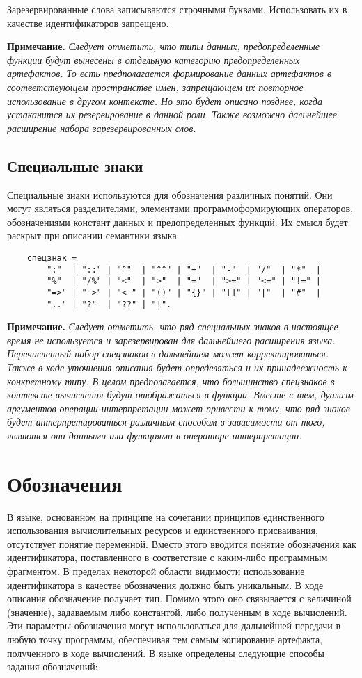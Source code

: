 {Зарезервированные слова записываются строчными буквами. Использовать их в качестве идентификаторов запрещено.

\textbf{Примечание.}
\textit{Следует отметить, что типы данных, предопределенные функции будут вынесены в отдельную категорию предопределенных артефактов. То есть предполагается формирование данных артефактов в соответствующем пространстве имен, запрещающем их повторное использование в другом контексте. Но это будет описано позднее, когда устаканится их резервирование в данной роли. Также возможно дальнейшее расширение набора зарезервированных слов.}

\subsection{Специальные знаки}

Специальные знаки используются для обозначения различных понятий. Они могут являться разделителями, элементами программоформирующих операторов, обозначениями констант данных и предопределенных функций. Их смысл будет раскрыт при описании семантики языка.

\begin{verbatim}
    спецзнак =
        ":"  | "::" | "^"  | "^^" | "+"  | "-"  | "/"  | "*"  |
        "%"  | "/%" | "<"  | ">"  | "="  | ">=" | "<=" | "!=" |
        "=>" | "->" | "<-" | "()" | "{}" | "[]" | "|"  | "#"  |
        ".." | "?"  | "??" | "!".
\end{verbatim}

\textbf{Примечание.}
\textit{Следует отметить, что ряд специальных знаков в настоящее время не используется и зарезервирован для дальнейшего расширения языка. Перечисленный набор спецзнаков в дальнейшем может корректироваться. Также в ходе уточнения описания будет определяться и их принадлежность к конкретному типу. В целом предполагается, что большинство спецзнаков в контексте вычисления будут отображаться в функции. Вместе с тем, дуализм аргументов операции интерпретации может привести к тому, что ряд знаков будет интерпретироваться различным способом в зависимости от того, являются они данными или функциями в операторе интерпретации.}

\section{Обозначения}
\label{smile:designation}

В языке, основанном на принципе на сочетании принципов единственного использования вычислительных ресурсов и единственного присваивания, отсутствует понятие переменной. Вместо этого вводится понятие обозначения как идентификатора, поставленного в соответствие с каким-либо программным фрагментом. В пределах некоторой области видимости использование идентификатора в качестве обозначения должно быть уникальным. В ходе описания обозначение получает тип. Помимо этого оно связывается с величиной (значение), задаваемым либо константой, либо полученным в ходе вычислений. Эти параметры обозначения могут использоваться для дальнейшей передачи в любую точку программы, обеспечивая тем самым копирование артефакта, полученного в ходе вычислений. В языке определены следующие способы задания обозначений:

}
